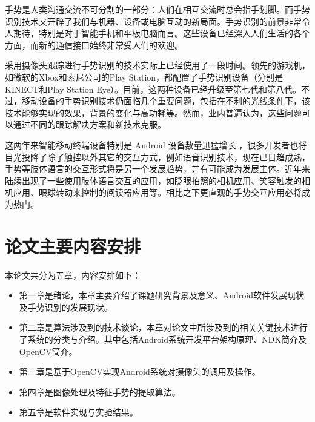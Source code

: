 \documentclass{XDBAthesis}
\begin{document}
手势是人类沟通交流不可分割的一部分：人们在相互交流时总会指手划脚。而手势识别技术又开辟了我们与机器、设备或电脑互动的新局面。手势识别的前景非常令人期待，特别是对于智能手机和平板电脑而言。这些设备已经深入人们生活的各个方面，而新的通信接口始终非常受人们的欢迎。

采用摄像头跟踪进行手势识别的技术实际上已经使用了一段时间。领先的游戏机，如微软的Xbox和索尼公司的Play Station，都配置了手势识别设备（分别是KINECT和Play Station Eye）。目前，这两种设备已经升级至第七代和第八代。不过，移动设备的手势识别技术仍面临几个重要问题，包括在不利的光线条件下，该技术能够实现的效果，背景的变化与高功耗等。然而，业内普遍认为，这些问题可以通过不同的跟踪解决方案和新技术克服。

这两年来智能移动终端设备特别是 Android 设备数量迅猛增长\cite{王赞超2013} ，很多开发者也将目光投降了除了触控以外其它的交互方式，例如语音识别技术，现在已日趋成熟，手势等肢体语言的交互形式将是另一个发展趋势，并有可能成为发展主体。近年来陆续出现了一些使用肢体语言交互的应用，如眨眼拍照的相机应用、笑容触发的相机应用、眼球转动来控制的阅读器应用等。相比之下更直观的手势交互应用必将成为热门。

\section{论文主要内容安排}

本论文共分为五章，内容安排如下：
\begin{itemize}
    \item 第一章是绪论，本章主要介绍了课题研究背景及意义、Android软件发展现状及手势识别的发展现状。
    \item 第二章是算法涉及到的技术谈论，本章对论文中所涉及到的相关关键技术进行了系统的分类与介绍。其中包括Android系统开发平台架构原理、NDK简介及OpenCV简介。
    \item 第三章是基于OpenCV实现Android系统对摄像头的调用及操作。
    \item 第四章是图像处理及特征手势的提取算法。
    \item 第五章是软件实现与实验结果。
\end{itemize}

\ifx\allfiles\undefined
%

\end{document}
